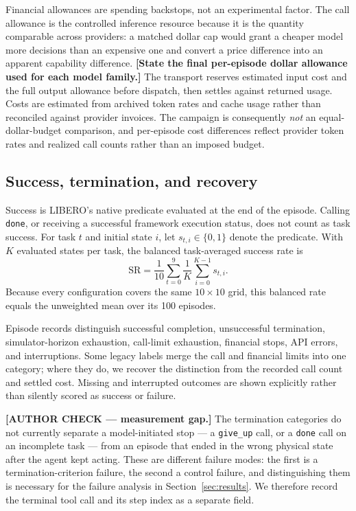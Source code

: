 \documentclass[11pt]{article}
\newcommand{\placeholder}[1]{\textbf{[#1]}}
\begin{document}
Financial allowances are spending backstops, not an experimental factor. The
call allowance is the controlled inference resource because it is the quantity
comparable across providers: a matched dollar cap would grant a cheaper model
more decisions than an expensive one and convert a price difference into an
apparent capability difference. \placeholder{State the final per-episode dollar
allowance used for each model family.} The transport reserves estimated input
cost and the full output allowance before dispatch, then settles against
returned usage. Costs are estimated from archived token rates and cache usage
rather than reconciled against provider invoices. The campaign is consequently
\emph{not} an equal-dollar-budget comparison, and per-episode cost differences
reflect provider token rates and realized call counts rather than an imposed
budget.

\subsection{Success, termination, and recovery}
Success is LIBERO's native predicate evaluated at the end of the episode.
Calling \texttt{done}, or receiving a successful framework execution status,
does not count as task success. For task $t$ and initial state $i$, let
$s_{t,i}\in\{0,1\}$ denote the predicate. With $K$ evaluated states per task,
the balanced task-averaged success rate is
\begin{equation}
\mathrm{SR}=\frac{1}{10}\sum_{t=0}^{9}\frac{1}{K}\sum_{i=0}^{K-1}s_{t,i}.
\label{eq:sr}
\end{equation}
Because every configuration covers the same $10\times10$ grid, this balanced
rate equals the unweighted mean over its 100 episodes.

Episode records distinguish successful completion, unsuccessful termination,
simulator-horizon exhaustion, call-limit exhaustion, financial stops, API
errors, and interruptions. Some legacy labels merge the call and financial
limits into one category; where they do, we recover the distinction from the
recorded call count and settled cost. Missing and interrupted outcomes are
shown explicitly rather than silently scored as success or failure.

\placeholder{AUTHOR CHECK --- measurement gap.} The termination categories do
not currently separate a model-initiated stop --- a \texttt{give\_up} call, or
a \texttt{done} call on an incomplete task --- from an episode that ended in
the wrong physical state after the agent kept acting. These are different
failure modes: the first is a termination-criterion failure, the second a
control failure, and distinguishing them is necessary for the failure analysis
in Section~\ref{sec:results}. We therefore record the terminal tool call and
its step index as a separate field.
\end{document}
